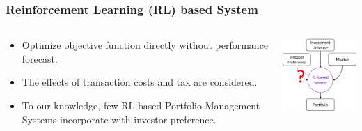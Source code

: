 \begin{frame}
\frametitle{Reinforcement Learning (RL) based System}
\begin{columns}
\begin{column}{0.55\textwidth}
\begin{itemize}
\item
Optimize objective function directly without performance forecast.
\item
The effects of transaction costs and tax are considered.
\item
\alert
{To our knowledge, few RL-based Portfolio Management Systems incorporate with investor preference.}
\end{itemize}
\end{column}
\begin{column}{0.45\textwidth}
\begin{center}
\includegraphics[width=4.8cm]{images/rl.png}
\end{center}
\end{column}
\end{columns}
\end{frame}






